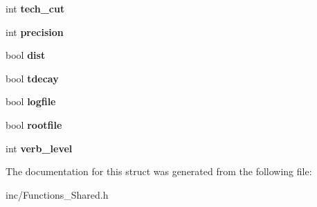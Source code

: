 \begin{DoxyCompactItemize}
\item 
\hypertarget{structopt_aced2f60b766a42008f9da934cef2f540}{int {\bfseries tech\-\_\-cut}}\label{structopt_aced2f60b766a42008f9da934cef2f540}

\item 
\hypertarget{structopt_ad36cc92ecbf8b2bc1deabde5268e9267}{int {\bfseries precision}}\label{structopt_ad36cc92ecbf8b2bc1deabde5268e9267}

\item 
\hypertarget{structopt_acd1b95ec5257a323cd3eb454c7ccd885}{bool {\bfseries dist}}\label{structopt_acd1b95ec5257a323cd3eb454c7ccd885}

\item 
\hypertarget{structopt_aedbcd7fea16a0fa968a1d75884fc0a4c}{bool {\bfseries tdecay}}\label{structopt_aedbcd7fea16a0fa968a1d75884fc0a4c}

\item 
\hypertarget{structopt_af0867351f5c3fd59d3cc5136cf423fc9}{bool {\bfseries logfile}}\label{structopt_af0867351f5c3fd59d3cc5136cf423fc9}

\item 
\hypertarget{structopt_a8d7af1ad473a324bd3633c7ef412c3fc}{bool {\bfseries rootfile}}\label{structopt_a8d7af1ad473a324bd3633c7ef412c3fc}

\item 
\hypertarget{structopt_abe0f9e730fd8eb6b107169359c859a3d}{int {\bfseries verb\-\_\-level}}\label{structopt_abe0f9e730fd8eb6b107169359c859a3d}

\end{DoxyCompactItemize}


The documentation for this struct was generated from the following file\-:\begin{DoxyCompactItemize}
\item 
inc/Functions\-\_\-\-Shared.\-h\end{DoxyCompactItemize}

